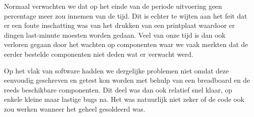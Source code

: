 \documentclass[a4paper,dutch]{article}
\begin{document}
Normaal verwachten we dat op het einde van de periode uitvoering geen percentage meer zou innemen van de tijd. Dit is echter te wijten aan het feit dat er een foute inschatting was van het drukken van een printplaat waardoor er dingen last-minute moesten worden gedaan. Veel van onze tijd is dan ook verloren gegaan door het wachten op componenten waar we vaak merkten dat de eerder bestelde componenten niet deden wat er verwacht werd. 



Op het vlak van software hadden we dergelijke problemen niet omdat deze eenvoudig geschreven en getest kon worden met behulp van een breadboard en de reeds beschikbare componenten. Dit deel was dan ook relatief snel klaar, op enkele kleine maar lastige bugs na. Het was natuurlijk niet zeker of de code ook zou werken wanneer het geheel gesoldeerd was. 
\end{document}
